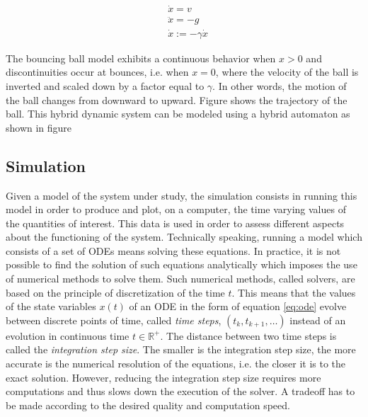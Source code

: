 \begin{equation}
\begin{aligned}
&\dot{x} = v\\
&\ddot{x} = -g\\
&\dot{x} := -\gamma \dot{x} 
\end{aligned}
\label{eq:bb}
\end{equation}  

The bouncing ball model exhibits a continuous behavior when $x > 0$ and discontinuities occur at bounces, i.e. when $x = 0$, where the velocity of the ball is inverted and scaled down by a factor equal to $\gamma$. In other words, the motion of the ball changes from downward to upward. Figure %
shows the trajectory of the ball. This hybrid dynamic system can be modeled using a hybrid automaton as shown in figure %

%

%

\subsection{Simulation}

Given a model of the system under study, the simulation consists in running this model in order to produce and plot, on a computer, the time varying values of the quantities of interest. This data is used in order to assess different aspects about the functioning of the system. Technically speaking, running a model which consists of a set of ODEs means solving these equations. In practice, it is not possible to find the solution of such equations analytically which imposes the use of numerical methods to solve them. Such numerical methods, called solvers, are based on the principle of discretization of the time $t$. This means that the values of the state variables $x(t)$ of an ODE in the form of equation \ref{eq:ode} evolve between discrete points of time, called \textit{time steps}, $(t_k, t_{k+1}, \ldots)$ instead of an evolution in continuous time $t \in \mathbb{R}^+$. The distance between two time steps is called the \textit{integration step size}. The smaller is the integration step size, the more accurate is the numerical resolution of the equations, i.e. the closer it is to the exact solution. However, reducing the integration step size requires more computations and thus slows down the execution of the solver. A tradeoff has to be made according to the desired quality and computation speed.

